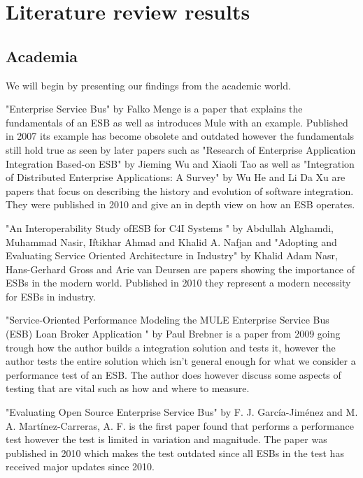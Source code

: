 \documentclass{llncs}
\begin{document}
\label{sec:method}
\section{Literature review results}
\label{sec:litrev}
\subsection{Academia}
We will begin by presenting our findings from the academic world.

"Enterprise Service Bus"\cite{falko07} by Falko Menge is a paper that explains the fundamentals of an ESB as well as introduces Mule with an example. Published in 2007 its example has become obsolete and outdated however the fundamentals still hold true as seen by later papers such as "Research of Enterprise Application Integration Based-on ESB" \cite{Jieming2010} by Jieming Wu and Xiaoli Tao as well as "Integration of Distributed Enterprise Applications: A Survey" \cite{HeIntegration} by Wu He and Li Da Xu are papers that focus on describing the history and evolution of software integration. They were published in 2010 and give an in depth view on how an ESB  operates.


"An Interoperability  Study  ofESB for C4I  Systems " \cite{Alghamdi2010} by Abdullah Alghamdi, Muhammad Nasir, Iftikhar Ahmad and Khalid A. Nafjan and  "Adopting and Evaluating Service Oriented Architecture in Industry" by Khalid Adam Nasr, Hans-Gerhard Gross and Arie van Deursen are papers showing the importance of ESBs in the modern world. Published in 2010 they represent a modern necessity for ESBs in industry.


"Service-Oriented Performance Modeling the MULE Enterprise Service Bus (ESB) Loan Broker Application " \cite{Brebner2009} by Paul Brebner is a paper from 2009 going trough how the author builds a integration solution and tests it, however the author tests the entire solution which isn't general enough for what we consider a performance test of an ESB. The author does however discuss some aspects of testing that are vital such as how and where to measure.

"Evaluating Open Source Enterprise Service Bus" \cite{Garcia2010} by F. J. García-Jiménez and M. A. Martínez-Carreras, A. F. is the first paper found that performs a performance test however the test is limited in variation and magnitude. The paper was published in 2010 which makes the test outdated since all ESBs in the test has received major updates since 2010.
\end{document}
